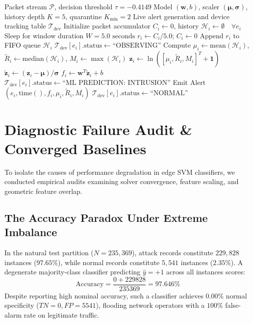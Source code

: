 \documentclass[conference]{IEEEtran}
\begin{document}
\begin{algorithm}[htbp]
\caption{GuardNode Live Edge Monitoring State Machine}
\label{alg_live}
\begin{algorithmic}[1]
\REQUIRE Packet stream $\mathcal{P}$, decision threshold $\tau = -0.4149$
\REQUIRE Model $(\mathbf{w}, b)$, scaler $(\boldsymbol{\mu}, \boldsymbol{\sigma})$, history depth $K=5$, quarantine $K_{\min}=2$
\ENSURE Live alert generation and device tracking table $\mathcal{T}_{\text{dev}}$
\STATE Initialize packet accumulator $C_i \leftarrow 0$, history $\mathcal{H}_i \leftarrow \emptyset \quad \forall e_i$
\LOOP
    \STATE Sleep for window duration $W = 5.0\text{ seconds}$
        \STATE $r_i \leftarrow C_i / 5.0$; \quad $C_i \leftarrow 0$
        \STATE Append $r_i$ to FIFO queue $\mathcal{H}_i$
            \STATE $\mathcal{T}_{\text{dev}}[e_i].\text{status} \leftarrow \text{``OBSERVING''}$
        \ELSE
            \STATE Compute $\mu_i \leftarrow \text{mean}(\mathcal{H}_i)$, $\tilde{R}_i \leftarrow \text{median}(\mathcal{H}_i)$, $M_i \leftarrow \max(\mathcal{H}_i)$
            \STATE $\mathbf{z}_i \leftarrow \ln([\mu_i, \tilde{R}_i, M_i]^T + \mathbf{1})$
            \STATE $\tilde{\mathbf{z}}_i \leftarrow (\mathbf{z}_i - \boldsymbol{\mu}) / \boldsymbol{\sigma}$
            \STATE $f_i \leftarrow \mathbf{w}^T \tilde{\mathbf{z}}_i + b$
                \STATE $\mathcal{T}_{\text{dev}}[e_i].\text{status} \leftarrow \text{``ML PREDICTION: INTRUSION''}$
                \STATE Emit Alert $(e_i, \text{time}(), f_i, \mu_i, \tilde{R}_i, M_i)$
            \ELSE
                \STATE $\mathcal{T}_{\text{dev}}[e_i].\text{status} \leftarrow \text{``NORMAL''}$
            \ENDIF
        \ENDIF
    \ENDFOR
\ENDLOOP
\end{algorithmic}
\end{algorithm}

\section{Diagnostic Failure Audit & Converged Baselines}

To isolate the causes of performance degradation in edge SVM classifiers, we conducted empirical audits examining solver convergence, feature scaling, and geometric feature overlap.

\subsection{The Accuracy Paradox Under Extreme Imbalance}
In the natural test partition ($N = 235,369$), attack records constitute $229,828$ instances ($97.65\%$), while normal records constitute $5,541$ instances ($2.35\%$). A degenerate majority-class classifier predicting $\hat{y} = +1$ across all instances scores:
\begin{equation}
\text{Accuracy} = \frac{0 + 229828}{235369} = 97.646\%
\end{equation}
Despite reporting high nominal accuracy, such a classifier achieves $0.00\%$ normal specificity ($TN = 0, FP = 5541$), flooding network operators with a $100\%$ false-alarm rate on legitimate traffic.
\end{document}
